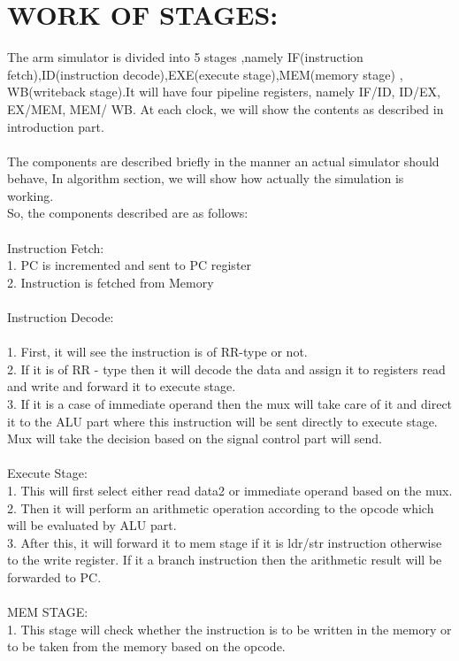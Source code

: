 \documentclass{scrreprt}
\begin{document}
\section{WORK OF STAGES:}
$ $\\
The arm simulator is divided into 5 stages ,namely IF(instruction fetch),ID(instruction decode),EXE(execute stage),MEM(memory stage) , WB(writeback stage).It will have four pipeline registers, namely IF/ID, ID/EX, EX/MEM, MEM/ WB. At each clock, we will show the contents as described in introduction part.\\
\\
The components are described briefly in the manner an actual simulator should behave, In algorithm section, we will show how
actually the simulation is working. \\ 
So, the components described are as follows: \\ \\
Instruction Fetch:\\
1. PC is incremented and sent to PC register\\
2. Instruction is fetched from Memory\\
\\ 
Instruction Decode:\\
\\1. First, it will see the instruction is of RR-type or not.
\\2. If it is of RR - type then it will decode the data and assign it to registers read and write and forward it to execute stage.
\\3. If it is a case of immediate operand then the mux will take care of it and direct it to the ALU part where this instruction
will be sent directly to execute stage. Mux will take the decision based on the signal control part will send.\\ 
\\ 
Execute Stage:
\\1. This will first select either read data2 or immediate operand based on the mux.
\\2. Then it will perform an arithmetic operation according to the opcode which will be evaluated by ALU part.
\\3. After this, it will forward it to mem stage if it is ldr/str instruction otherwise to the write register. If it a branch instruction then the arithmetic result will be forwarded to PC.
\\
\\
MEM STAGE: \\
1. This stage will check whether the instruction is to be written in the memory or to be taken from the memory based on the opcode.
\end{document}

